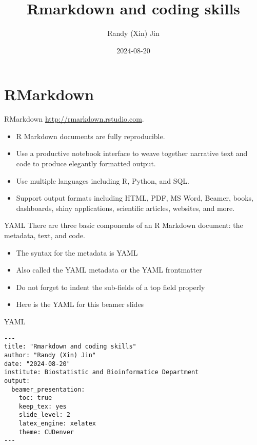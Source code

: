 \documentclass[
  ignorenonframetext,
]{beamer}
\title{Rmarkdown and coding skills}
\author{Randy (Xin) Jin}
\date{2024-08-20}
\institute{Biostatistic and Bioinformatic Department}
\begin{document}
\frame{\titlepage}

\begin{frame}[allowframebreaks]
  \tableofcontents[hideallsubsections]
\end{frame}
\section{RMarkdown}\label{rmarkdown}

\begin{frame}{RMarkdown \url{http://rmarkdown.rstudio.com}.}
\label{rmarkdown-httprmarkdown.rstudio.com.}
\begin{itemize}
\item
  R Markdown documents are fully reproducible.
\item
  Use a productive notebook interface to weave together narrative text
  and code to produce elegantly formatted output.
\item
  Use multiple languages including R, Python, and SQL.
\item
  Support output formats including HTML, PDF, MS Word, Beamer, books,
  dashboards, shiny applications, scientific articles, websites, and
  more.
\end{itemize}
\end{frame}

\begin{frame}{YAML}
\label{yaml}
There are three basic components of an R Markdown document: the
metadata, text, and code.

\begin{itemize}
\item
  The syntax for the metadata is YAML
\item
  Also called the YAML metadata or the YAML frontmatter
\item
  Do not forget to indent the sub-fields of a top field properly
\item
  Here is the YAML for this beamer slides
\end{itemize}
\end{frame}

\begin{frame}[fragile]{YAML}
\label{yaml-1}
\begin{verbatim}
---
title: "Rmarkdown and coding skills"
author: "Randy (Xin) Jin"
date: "2024-08-20"
institute: Biostatistic and Bioinformatice Department
output:
  beamer_presentation:
    toc: true
    keep_tex: yes
    slide_level: 2
    latex_engine: xelatex
    theme: CUDenver
---
\end{verbatim}
\end{frame}
\end{document}

